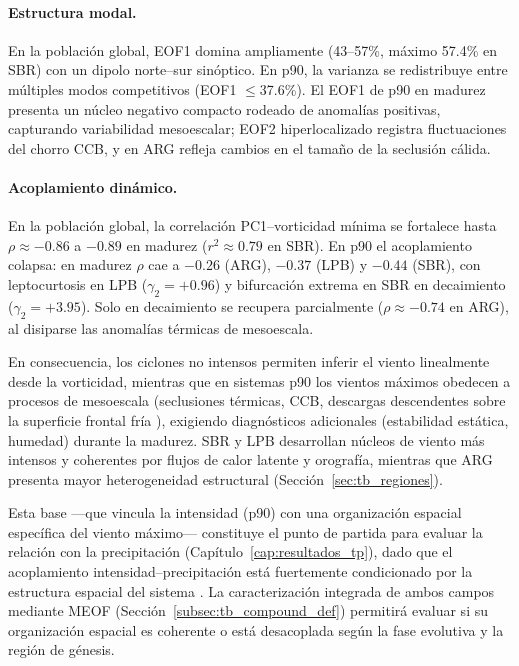 \paragraph{Estructura modal.}
En la población global, EOF1 domina ampliamente (43--57\%, máximo 57.4\% en SBR) con un dipolo norte--sur sinóptico. 
En p90, la varianza se redistribuye entre múltiples modos competitivos (EOF1 $\leq$37.6\%).
El EOF1 de p90 en madurez presenta un núcleo negativo compacto rodeado de anomalías positivas, capturando variabilidad mesoescalar; EOF2 hiperlocalizado registra fluctuaciones del chorro CCB, y en ARG refleja cambios en el tamaño de la seclusión cálida.

\paragraph{Acoplamiento dinámico.}
En la población global, la correlación PC1--vorticidad mínima se fortalece hasta $\rho \approx -0.86$ a $-0.89$ en madurez ($r^2 \approx 0.79$ en SBR).
En p90 el acoplamiento colapsa: en madurez $\rho$ cae a $-0.26$ (ARG), $-0.37$ (LPB) y $-0.44$ (SBR), con leptocurtosis en LPB ($\gamma_2 = +0.96$) y bifurcación extrema en SBR en decaimiento ($\gamma_2 = +3.95$). 
Solo en decaimiento se recupera parcialmente ($\rho \approx -0.74$ en ARG), al disiparse las anomalías térmicas de mesoescala.

En consecuencia, los ciclones no intensos permiten inferir el viento linealmente desde la vorticidad, mientras que en sistemas p90 los vientos máximos obedecen a procesos de mesoescala (seclusiones térmicas, CCB, descargas descendentes sobre la superficie frontal fría \citep{hyeok2024extrem}), exigiendo diagnósticos adicionales (estabilidad estática, humedad) durante la madurez. 
SBR y LPB desarrollan núcleos de viento más intensos y coherentes por flujos de calor latente y orografía, mientras que ARG presenta mayor heterogeneidad estructural (Sección~\ref{sec:tb_regiones}).

Esta base ---que vincula la intensidad (p90) con una organización espacial específica del viento máximo--- constituye el punto de partida para evaluar la relación con la precipitación (Capítulo~\ref{cap:resultados_tp}), dado que el acoplamiento intensidad--precipitación está fuertemente condicionado por la estructura espacial del sistema \citep{sinclair2023relationship}. 
La caracterización integrada de ambos campos mediante MEOF (Sección~\ref{subsec:tb_compound_def}) permitirá evaluar si su organización espacial es coherente o está desacoplada según la fase evolutiva y la región de génesis.